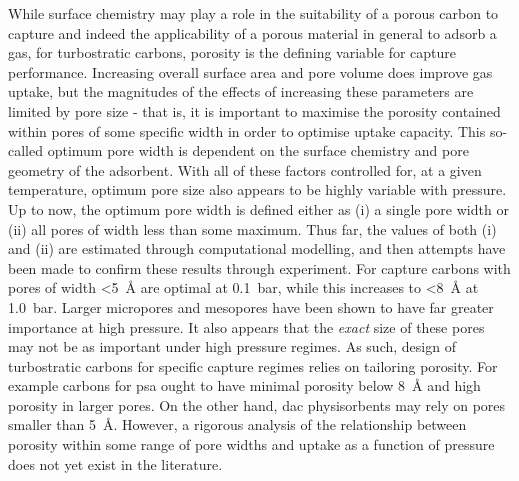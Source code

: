 While surface chemistry may play a role in the suitability of a porous carbon to capture  and indeed the applicability of a porous material in general to adsorb a gas,\citep{Lueking2004, Li2011a, Li2020Sustainable, wang2012significantly, Botome2017Preparation, liang2013, Kayal2018Activated} for \glspl{turbostratic carbon}, porosity is the defining variable for  capture performance.\citep{Sevilla2014Energy, Adeniran2016Is, Sevilla2013Assessment, Choi2019Unique, Lee2013Determination, Presser2011Effect, Wickramaratne2013Importance}  Increasing overall surface area and pore volume does improve gas uptake,\citep{Cox2017Ultra, Blankenship2017Cigarette} but the magnitudes of the effects of increasing these parameters are limited by pore size\citep{Sevilla2014Energy, Sevilla2013Assessment, Choi2019Unique, Li2019Selective, Cabria2007optimum, Gogotsi2009, Masika2012} - that is, it is important to maximise the porosity contained within pores of some specific width in order to optimise  uptake capacity. This so-called optimum pore width is dependent on the surface chemistry\citep{wang2012significantly, Kayal2018Activated, Lueking2004} and pore geometry\citep{Rzepka1998Physisorption, Zhou2004comparative, Hlushak2018Heat} of the \gls{adsorbent}. With all of these factors controlled for, at a given temperature, optimum pore size also appears to be highly variable with pressure.\citep{Presser2011Effect, DelaCasaLillo2002Hydrogen} Up to now, the optimum pore width is defined either as (i) a single pore width\citep{Sevilla2014Energy, Choi2019Unique, Li2019Selective} or (ii) all pores of width less than some maximum.\citep{Biloe2002Optimal, Cabria2007optimum, Presser2011Effect} Thus far, the values of both (i) and (ii) are estimated through computational modelling,\citep{Biloe2002Optimal, Cabria2007optimum, Hlushak2018Heat} and then attempts have been made to confirm these results through experiment.\citep{Choi2019Unique, Presser2011Effect} For  capture carbons with pores of width \qty{<5}{\angstrom} are optimal at \qty{0.1}{\bar}, while this increases to \qty{<8}{\angstrom} at \qty{1.0}{\bar}.\citep{Presser2011Effect} Larger \glspl{micropore} and \glspl{mesopore} have been shown to have far greater importance at high pressure.\citep{Sevilla2013Assessment, Casco2014Effect, Sevilla2018Optimization} It also appears that the \textit{exact} size of these pores may not be as important under high pressure regimes.\citep{Blankenship2022Modulating} As such, design of \glspl{turbostratic carbon} for specific  capture regimes relies on tailoring porosity. For example carbons for \acrshort{psa} ought to have minimal porosity below \qty{8}{\angstrom} and high porosity in larger pores. On the other hand, \acrshort{dac} physisorbents may rely on pores smaller than \qty{5}{\angstrom}. However, a rigorous analysis of the relationship between porosity within some range of pore widths and  uptake as a function of pressure does not yet exist in the literature.


